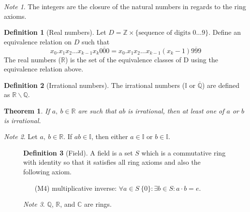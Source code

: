 \documentclass{article}
\newcommand*{\Z}{\mathbb{Z}}
\newcommand*{\Q}{\mathbb{Q}}
\newcommand*{\I}{\mathbb{I}}
\newcommand*{\R}{\mathbb{R}}
\newcommand*{\C}{\mathbb{C}}
\theoremstyle{plain}
\newtheorem{theorem}{Theorem}[section]
\numberwithin{theorem}{subsection}
\theoremstyle{definition}
\newtheorem{definition}{Definition}[section]
\numberwithin{definition}{subsection}
\theoremstyle{remark}
\newtheorem{note}{Note}[section]
\numberwithin{note}{subsection}
\begin{document}
\begin{note}
    The integers are the closure of the natural numbers in regards to the ring axioms.
\end{note}
%
\begin{definition}[Real numbers]
    Let $D = \Z \times \{\text{sequence of digits $0\ldots 9$}\}$.
    Define an equivalence relation on $D$ such that
    \begin{equation*}
		x_0 . x_1 x_2 \dots x_{k-1} x_k \overline{000} = x_0 . x_1 x_2 \dots x_{k-1} \left(x_k - 1\right)\overline{999}
	\end{equation*}
    The real numbers ($\R$) is the set of the equivalence classes of D using the equivalence relation above.
\end{definition}
%
\begin{definition}[Irrational numbers]
    The irrational numbers ($\I$ or $\overline{\Q}$) are defined as $\R\backslash\Q$.
\end{definition}
\begin{theorem}
	If $a,\:b\in\R$ are such that $ab$ is irrational, then at least one of $a$ or $b$ is irrational.
\end{theorem}
%
\begin{note}
    Let $a,\: b\in \R$. If $ab\in\I$, then either $a\in\I$ or $b\in\I$.
\end{note}
%
\begin{figure}[H]
\begin{mdframed}[style=exampledefault,frametitle={Field Axioms}]
	\begin{definition}[Field]
	A field is a set $S$ which is a commutative ring with identity so that it satisfies all ring axioms and also the following axiom.
	\end{definition}
	\begin{enumerate}
		\item[(M4)] multiplicative inverse: $\forall a \in S \ \{0\}:\exists b \in S: a\cdot b=e$.
	\end{enumerate}
\end{mdframed}
\begin{note}
	$\Q$, $\R$, and $\C$ are rings.
\end{note}
\end{figure}
%
\end{document}
